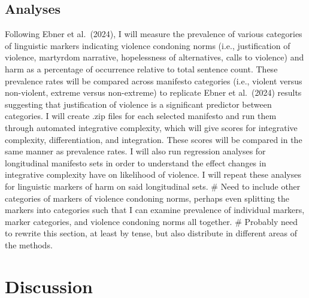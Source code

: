 \documentclass[
  english,
  man]{apa6}
\begin{document}
\subsection{Analyses}\label{analyses}

Following Ebner et al.~(2024), I will measure the prevalence of various categories of
linguistic markers indicating violence condoning norms (i.e., justification of violence,
martyrdom narrative, hopelessness of alternatives, calls to violence) and harm as a
percentage of occurrence relative to total sentence count. These prevalence rates will be
compared across manifesto categories (i.e., violent versus non-violent, extreme versus
non-extreme) to replicate Ebner et al.~(2024) results suggesting that justification of
violence is a significant predictor between categories. I will create .zip files for each
selected manifesto and run them through automated integrative complexity, which will give
scores for integrative complexity, differentiation, and integration. These scores will be
compared in the same manner as prevalence rates. I will also run regression analyses for
longitudinal manifesto sets in order to understand the effect changes in integrative
complexity have on likelihood of violence. I will repeat these analyses for linguistic
markers of harm on said longitudinal sets.
\#\textbar{} Need to include other categories of markers of violence condoning norms, perhaps even splitting the markers into categories such that I can examine prevalence of individual markers, marker categories, and violence condoning norms all together.
\#\textbar{} Probably need to rewrite this section, at least by tense, but also distribute in different areas of the methods.

\section{Discussion}\label{discussion}
\end{document}
